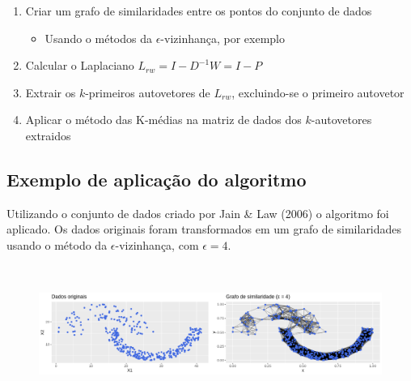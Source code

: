 \documentclass[]{article}
\begin{document}
\begin{enumerate}
\item Criar um grafo de similaridades entre os pontos do conjunto de dados 

\begin{itemize}
\item Usando o métodos da $\epsilon$-vizinhança, por exemplo

\end{itemize}

\vspace{0.5cm}
\item Calcular o Laplaciano $L_{rw} = I - D^{-1}W = I - P$

\vspace{0.5cm}

\item Extrair os $k$-primeiros autovetores de $L_{rw}$, excluindo-se o primeiro autovetor

\vspace{0.5cm}

\item Aplicar o método das K-médias na matriz de dados dos $k$-autovetores extraidos

\end{enumerate}

\vspace{1cm}

\subsection{Exemplo de aplicação do algoritmo}

Utilizando o conjunto de dados criado por Jain \& Law (2006) o algoritmo foi aplicado. Os dados originais foram transformados em um grafo de similaridades usando o método da $\epsilon$-vizinhança, com $\epsilon = 4$. 

\vspace{1cm}
\begin{figure}[h!]
\includegraphics[width=13cm, height = 4.5cm]{horse}
\end{figure}
\end{document}
